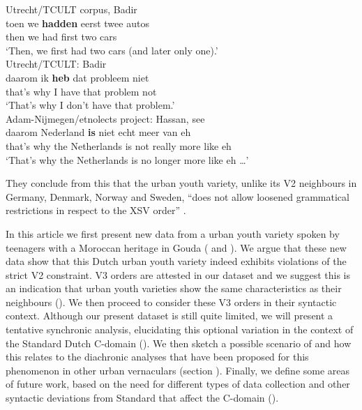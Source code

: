 \documentclass[output=paper]{langsci/langscibook}
\begin{document}
\ea
    \ea Utrecht/TCULT corpus, Badir\\
    \gll toen we \textbf{hadden} eerst twee autos\\
    then we had first two cars\\
    \trans \enquote*{Then, we first had two cars (and later only one).}\\
    \ex Utrecht/TCULT: Badir\\
    \gll daarom ik \textbf{heb} dat probleem niet\\
    {that's why} I have that problem not\\
    \trans \enquote*{That's why I don't have that problem.}\\
    \ex Adam-Nijmegen/etnolects project: Hassan, see \citet{Lukassen:2011}\\
    \gll daarom Nederland \textbf{is} niet echt meer van eh\\
    {that's why} {the Netherlands} is not really more like eh\\
    \trans \enquote*{That's why the Netherlands is no longer more like eh \dots}
    \z
\z

\noindent They conclude from this that the  urban youth variety, unlike
its V2 neighbours in Germany, Denmark, Norway and Sweden, \enquote{does not
allow loosened grammatical restrictions in respect to the XSV order}
\citep[88]{Freywaldetal:2015}.

In this article we first present new data from a  urban youth variety
spoken by  teenagers with a Moroccan heritage in Gouda
( and ). We argue that these new data show that this
Dutch urban youth variety indeed exhibits violations of the strict V2
constraint. V3 orders are attested in our dataset and we suggest this is an
indication that  urban youth varieties show the same characteristics as
their  neighbours (). We then proceed to
consider these V3 orders in their syntactic context. Although our present
dataset is still quite limited, we will present a tentative synchronic
analysis, elucidating this optional variation in the context of the Standard
Dutch C-domain (). We then sketch a possible scenario of
 and how this relates to the diachronic analyses that have been
proposed for this phenomenon in other  urban vernaculars (section
). Finally, we define some areas of future work, based on the
need for different types of data collection and other syntactic deviations from
Standard  that affect the C-domain ().
\end{document}
